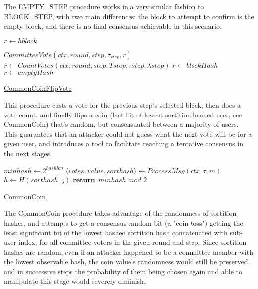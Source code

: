 \documentclass[10pt,a4paper]{article}
\begin{document}
The EMPTY\_STEP procedure works in a very similar fashion to BLOCK\_STEP, with two main differences: 
the block to attempt to confirm is the empty block, and there is no final consensus achievable in this scenario.


\begin{algorithm}
    \begin{algorithmic}[H]
        \State $r \gets hblock$
    
        \State $CommitteeVote(ctx, round, step, \tau_{step}, r)$
        \State $r \gets CountVotes(ctx,round,step,Tstep,\tau step,\lambda step)$
                \State $r \gets blockHash$
            \Else
                \State $r \gets emptyHash$
            \EndIf
        \EndIf
    \EndFunction
    \end{algorithmic}
    \caption{\underline{CommonCoinFlipVote}}
\end{algorithm}

This procedure casts a vote for the previous step's selected block, then does a vote count,
and finally flips a coin (last bit of lowest sortition hashed user, see CommonCoin) that's random,
but consensuated between a majority of users. This guarantees that an attacker could not guess what the
next vote will be for a given user, and introduces a tool to facilitate reaching a tentative consensus in the next stages.

\begin{algorithm}
    \begin{algorithmic}[H]

    \State $minhash \gets 2^{hashlen}$
        \State $\langle votes,value,sorthash\rangle \gets ProcessMsg(ctx,\tau,m)$
                \State $h \gets H(sorthash||j)$
        \EndFor
    \EndFor
    $\Return$ $minhash$ $mod$ $2$
    \EndFunction
    \end{algorithmic}
    \caption{\underline{CommonCoin}}
\end{algorithm}

The CommonCoin procedure takes advantage of the randomness of sortition hashes, and attempts to
get a consensus random bit (a "coin toss") getting the least significant bit of the lowest hashed
sortition hash concatenated with sub-user index, for all committee voters in the given round and step.
Since sortition hashes are random, even if an attacker happened to be a committee member with the lowest observable hash,
the coin value's randomness would still be preserved, and in successive steps the probability of them being chosen again and
able to manipulate this stage would severely diminish.
\end{document}

